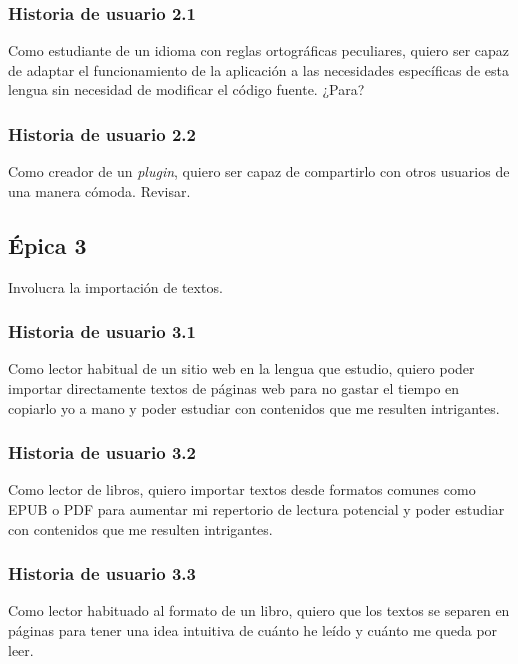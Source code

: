 \subsubsection{Historia de usuario 2.1}

Como estudiante de un idioma con reglas ortográficas peculiares, quiero ser capaz de adaptar el funcionamiento de la aplicación a las necesidades específicas de esta lengua sin necesidad de modificar el código fuente. \todo ¿Para?

\subsubsection{Historia de usuario 2.2}

Como creador de un \textit{plugin}, quiero ser capaz de compartirlo con otros usuarios de una manera cómoda. \todo Revisar.

\subsection{Épica 3}

Involucra la importación de textos.

\subsubsection{Historia de usuario 3.1}

Como lector habitual de un sitio web en la lengua que estudio, quiero poder importar directamente textos de páginas web para no gastar el tiempo en copiarlo yo a mano y poder estudiar con contenidos que me resulten intrigantes.

\subsubsection{Historia de usuario 3.2}

Como lector de libros, quiero importar textos desde formatos comunes como EPUB o PDF para aumentar mi repertorio de lectura potencial y poder estudiar con contenidos que me resulten intrigantes.

\subsubsection{Historia de usuario 3.3}

Como lector habituado al formato de un libro, quiero que los textos se separen en páginas para tener una idea intuitiva de cuánto he leído y cuánto me queda por leer.

